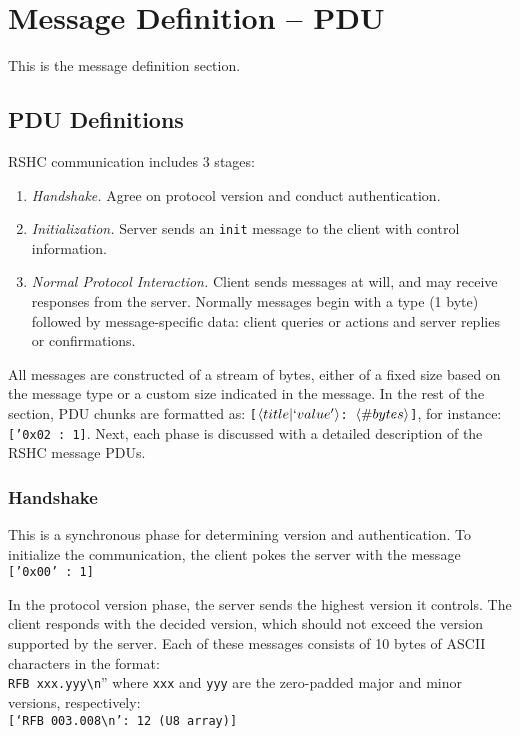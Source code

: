 \section{Message Definition -- PDU}
\label{sec:pdus}

This is the message definition section.





\subsection{PDU Definitions}
\label{sec:pdus:pdu}

RSHC communication includes 3 stages:

\begin{enumerate}

\item {\em Handshake.} Agree on protocol version and conduct authentication.

\item {\em Initialization.} Server sends an {\tt init} message to the client with control information.

\item {\em Normal Protocol Interaction.} Client sends messages at will, and may receive responses from the server. Normally messages begin with a type (1 byte) followed by message-specific data: client queries or actions and server replies or confirmations.

\end{enumerate}

All messages are constructed of a stream of bytes, either of a fixed size based on the message type or a custom size indicated in the message. In the rest of the section, PDU chunks are formatted as: {\tt [$\left \langle title | `value' \right \rangle $: $\left \langle \#bytes \right \rangle $]}, for instance: {\tt ['0x02 : 1]}.
Next, each phase is discussed with a detailed description of the RSHC message PDUs.

\subsubsection{Handshake}
\label{sec:pdus:pdu:hs}

This is a synchronous phase for determining version and authentication. To initialize the communication, the client pokes the server with the message {\tt ['0x00' : 1]}

In the protocol version phase, the server sends the highest version it controls. The client responds with the decided version, which should not exceed the version supported by the server. Each of these messages consists of 10 bytes of ASCII characters in the format:\\
{\tt RFB xxx.yyy\textbackslash n}'' where {\tt xxx} and {\tt yyy} are the zero-padded major and minor versions, respectively: \\
{\tt [`RFB 003.008\textbackslash n': 12 (U8 array)]}

